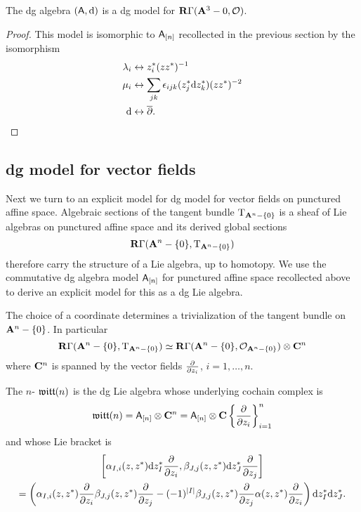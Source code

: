 \documentclass[11pt]{amsart}
\begin{document}
\begin{prop}
The dg algebra $(\mathsf A,{\rm d})$ is a dg model for $\mathbf{R} \Gamma({\mathbf{A}}^3 - 0, \mathcal O)$.
\end{prop}
\begin{proof}
This model is isomorphic to $\mathsf A_{[n]}$ recollected in the previous section by the isomorphism
\begin{align*}
\lambda_i & \leftrightarrow z_i^* (zz^*)^{-1} \\
\mu_i & \leftrightarrow \sum_{jk} {\epsilon}_{ijk} (z_j^* {\rm d} z_k^*) (z z^*)^{-2}  \\
{\rm d} & \leftrightarrow \overline{\partial} .
\end{align*}

\end{proof}

\subsection{dg model for vector fields}

Next we turn to an explicit model for dg model for vector fields on punctured affine space.
Algebraic sections of the tangent bundle ${\rm T}_{{\mathbf{A}}^n - \{0\}}$ is a sheaf of Lie algebras on punctured affine space and its derived global sections 
\begin{equation}
\mathbf{R} \Gamma({\mathbf{A}}^n - \{0\}, {\rm T}_{{\mathbf{A}}^n-\{0\}})
\end{equation}
therefore carry the structure of a Lie algebra, up to homotopy.
We use the commutative dg algebra model $\mathsf A_{[n]}$ for punctured affine space recollected above to derive an explicit model for this as a dg Lie algebra.

The choice of a coordinate determines a trivialization of the tangent bundle on ${\mathbf{A}}^n - \{0\}$.
In particular
\begin{equation}
\mathbf{R} \Gamma({\mathbf{A}}^n - \{0\}, {\rm T}_{{\mathbf{A}}^n-\{0\}}) \simeq \mathbf{R} \Gamma({\mathbf{A}}^n - \{0\}, \mathcal O_{{\mathbf{A}}^n - \{0\}}) \otimes \mathbf{C}^n
\end{equation}
where $\mathbf{C}^n$ is spanned by the vector fields $\frac{\partial}{\partial z_i}$, $i=1,\ldots,n$.

\begin{dfn}
The $n$- $\mathfrak{witt}(n)$ is the dg Lie algebra whose underlying cochain complex is
\begin{equation}
\mathfrak{witt}(n) = \mathsf A_{[n]} \otimes \mathbf{C}^n = \mathsf A_{[n]} \otimes \mathbf{C} \left\{\frac{\partial}{\partial z_i}\right\}_{i=1}^n
\end{equation}
and whose Lie bracket is
\begin{multline}
\left[\alpha_{I,i} (z,z^*) {\rm d} z^*_I \frac{\partial}{\partial z_i}, \beta_{J,j} (z,z^*) {\rm d} z^*_J \frac{\partial}{\partial z_j} \right] \\ = \left(\alpha_{I,i}(z,z^*) \frac{\partial}{\partial z_i} \beta_{J,j}(z,z^*)\frac{\partial}{\partial z_j} - (-1)^{|I|} \beta_{J,j}(z,z^*) \frac{\partial}{\partial z_j}\alpha(z,z^*) \frac{\partial}{\partial z_i}\right) {\rm d} z_I^* {\rm d} z_J^* .
\end{multline}
\end{dfn}
\end{document}
